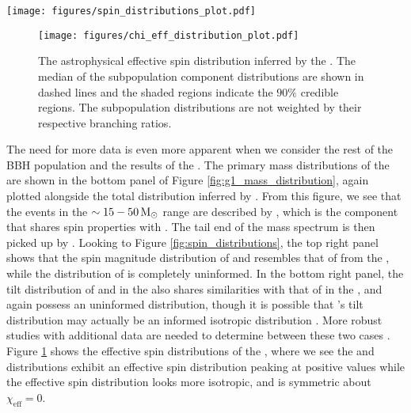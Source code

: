 \begin{figure*}[ht!]
    \begin{centering}
        \texttt{[image: figures/spin\_distributions\_plot.pdf]}
        \caption{The astrophysical spin magnitude and tilt distributions inferred by the \base{} (top left and bottom left) and the \comp{} (top right and bottom right). In each panel, the median of the subpopulation component distributions are shown in dashed lines and the shaded regions indicate the $90\%$ credible regions. The subpopulation distributions are not weighted by their respective branching ratios.}
        \label{fig:spin_distributions}
    \end{centering}
\end{figure*}

\begin{figure}[hb]
    \begin{centering}
        \texttt{[image: figures/chi\_eff\_distribution\_plot.pdf]}
        \caption{The astrophysical effective spin distribution inferred by the \comp{}. The median of the subpopulation component distributions are shown in dashed lines and the shaded regions indicate the $90\%$ credible regions. The subpopulation distributions are not weighted by their respective branching ratios.}
        \label{fig:chi_eff_distributions}
    \end{centering}
\end{figure}


The need for more data is even more apparent when we consider the rest of the BBH population and the results of the \comp{}. The primary mass distributions of the \comp{} are shown in the bottom panel of Figure \ref{fig:g1_mass_distribution}, again plotted alongside the total distribution inferred by \brucepaper{}. From this figure, we see that the events in the $\sim15-50 {\,\rm M}_\odot$ range are described by \contA{}, which is the component that shares spin properties with \first{}. The tail end of the mass spectrum is then picked up by \contB{}. Looking to Figure \ref{fig:spin_distributions}, the top right panel shows that the spin magnitude distribution of \first{} and \contA{} resembles that of \first{} from the \base{}, while the distribution of \contB{} is completely uninformed. In the bottom right panel, the tilt distribution of \first{} and \contA{} in the \comp{} also shares similarities with that of \first{} in the \base{}, and again \contB{} possess an uninformed distribution, though it is possible that \contB{}'s tilt distribution may actually be an informed isotropic distribution . More robust studies with additional data are needed to determine between these two cases . Figure \ref{fig:chi_eff_distributions} shows the effective spin distributions of the \comp{}, where we see the \first{} and \contA{} distributions exhibit an effective spin distribution peaking at positive values while the \contB{} effective spin distribution looks more isotropic, and is symmetric about $\chi_\mathrm{eff} = 0$.

